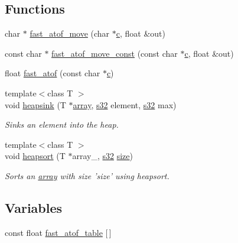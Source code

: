 \subsection*{Functions}
\begin{CompactItemize}
\item 
char $\ast$ \hyperlink{namespaceirr_1_1core_6256e94cb35bb421e71505abe0a6b137}{fast\_\-atof\_\-move} (char $\ast$\hyperlink{glext__bak_8h_4c662e60c03c48f5718de0c175211fb0}{c}, float \&out)
\item 
const char $\ast$ \hyperlink{namespaceirr_1_1core_b092292087196d1b1e19b80b7cdaf05d}{fast\_\-atof\_\-move\_\-const} (const char $\ast$\hyperlink{glext__bak_8h_4c662e60c03c48f5718de0c175211fb0}{c}, float \&out)
\item 
float \hyperlink{namespaceirr_1_1core_5af60e435db3af3df0bf89e1d2f55aa7}{fast\_\-atof} (const char $\ast$\hyperlink{glext__bak_8h_4c662e60c03c48f5718de0c175211fb0}{c})
\item 
{\footnotesize template$<$class T $>$ }\\void \hyperlink{namespaceirr_1_1core_d22e0ca7ac302752a27dc29f35a21ec6}{heapsink} (T $\ast$\hyperlink{classirr_1_1core_1_1array}{array}, \hyperlink{namespaceirr_c66849b7a6ed16e30ebede579f9b47c6}{s32} element, \hyperlink{namespaceirr_c66849b7a6ed16e30ebede579f9b47c6}{s32} max)
\begin{CompactList}\small\item\em Sinks an element into the heap. \item\end{CompactList}\item 
{\footnotesize template$<$class T $>$ }\\void \hyperlink{namespaceirr_1_1core_4f062bd63b7d3048b4af2127e4a708c5}{heapsort} (T $\ast$array\_\-, \hyperlink{namespaceirr_c66849b7a6ed16e30ebede579f9b47c6}{s32} \hyperlink{glext__bak_8h_3d1e3edfcf61ca2d831883e1afbad89e}{size})
\begin{CompactList}\small\item\em Sorts an \hyperlink{classirr_1_1core_1_1array}{array} with size 'size' using heapsort. \item\end{CompactList}\end{CompactItemize}
\subsection*{Variables}
\begin{CompactItemize}
\item 
const float \hyperlink{namespaceirr_1_1core_92c5412fe484f856839d848f0b5e3aba}{fast\_\-atof\_\-table} \mbox{[}$\,$\mbox{]}
\end{CompactItemize}


